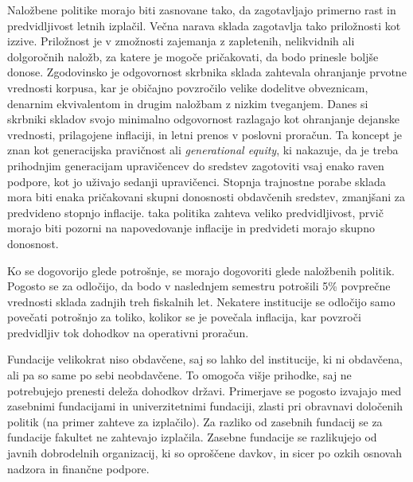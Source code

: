 \documentclass[12pt, a4paper]{article}
\begin{document}
Naložbene politike morajo biti zasnovane tako, da zagotavljajo primerno rast in predvidljivost letnih izplačil. Večna narava sklada zagotavlja tako priložnosti kot izzive. Priložnost je v zmožnosti zajemanja z zapletenih, nelikvidnih ali dolgoročnih naložb, za katere je mogoče pričakovati, da bodo prinesle boljše donose. Zgodovinsko je odgovornost skrbnika sklada zahtevala ohranjanje prvotne vrednosti korpusa, kar je običajno povzročilo velike dodelitve obveznicam, denarnim ekvivalentom in drugim naložbam z nizkim tveganjem. Danes si skrbniki skladov svojo minimalno odgovornost razlagajo kot ohranjanje dejanske vrednosti, prilagojene inflaciji, in letni prenos v poslovni proračun. Ta koncept je znan kot generacijska pravičnost ali \textit{generational equity}, ki nakazuje, da je treba prihodnjim generacijam upravičencev do sredstev zagotoviti vsaj enako raven podpore, kot jo uživajo sedanji upravičenci. Stopnja trajnostne porabe sklada mora biti enaka pričakovani skupni donosnosti obdavčenih sredstev, zmanjšani za predvideno stopnjo inflacije. taka politika zahteva veliko predvidljivost, prvič morajo biti pozorni na napovedovanje inflacije in predvideti morajo skupno donosnost. 

Ko se dogovorijo glede potrošnje, se morajo dogovoriti glede naložbenih politik. Pogosto se za odločijo, da bodo v naslednjem semestru potrošili 5\% povprečne vrednosti sklada zadnjih treh fiskalnih let. Nekatere institucije se odločijo samo povečati potrošnjo za toliko, kolikor se je povečala inflacija, kar povzroči predvidljiv tok dohodkov na operativni proračun. \cite{investment1}

Fundacije velikokrat niso obdavčene, saj so lahko del institucije, ki ni obdavčena, ali pa so same po sebi neobdavčene. To omogoča višje prihodke, saj ne potrebujejo prenesti deleža dohodkov državi. Primerjave se pogosto izvajajo med zasebnimi fundacijami in univerzitetnimi fundaciji, zlasti pri obravnavi določenih politik (na primer zahteve za izplačilo). Za razliko od zasebnih fundacij se za fundacije fakultet ne zahtevajo izplačila. Zasebne fundacije se razlikujejo od javnih dobrodelnih organizacij, ki so oproščene davkov, in sicer po ozkih osnovah nadzora in finančne podpore.
\end{document}
